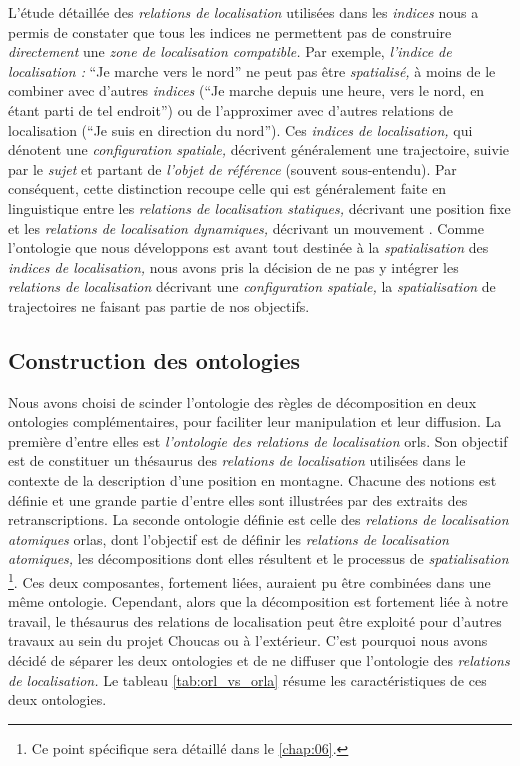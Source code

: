 L'étude détaillée des \emph{relations de localisation} utilisées dans
les \emph{indices} nous a permis de constater que tous les indices ne
permettent pas de construire \emph{directement} une \emph{zone de
  localisation compatible.} Par exemple, \emph{l'indice de
  localisation :} \enquote{Je marche vers le nord} ne peut pas être
\emph{spatialisé,} à moins de le combiner avec d'autres \emph{indices}
(\eg \enquote{Je marche depuis une heure, vers le nord, en étant parti
  de tel endroit}) ou de l'approximer avec d'autres relations de
localisation (\eg \enquote{Je suis en direction du nord}). Ces
\emph{indices de localisation,} qui dénotent une \emph{configuration
  spatiale,} décrivent généralement une trajectoire, suivie par le
\emph{sujet} et partant de \emph{l'objet de référence} (souvent
sous-entendu). Par conséquent, cette distinction recoupe celle qui est
généralement faite en linguistique entre les \emph{relations de
  localisation statiques,} décrivant une position fixe et les
\emph{relations de localisation dynamiques,} décrivant un mouvement
\autocite{Borillo1998}. Comme l'ontologie que nous développons est
avant tout destinée à la \emph{spatialisation} des \emph{indices de
  localisation,} nous avons pris la décision de ne pas y intégrer les
\emph{relations de localisation} décrivant une \emph{configuration
  spatiale,} la \emph{spatialisation} de trajectoires ne faisant pas
partie de nos objectifs.

\subsection{Construction des ontologies}


Nous avons choisi de scinder l'ontologie des règles de décomposition
en deux ontologies complémentaires, pour faciliter leur manipulation
et leur diffusion. La première d'entre elles est \emph{l'ontologie des
  relations de localisation} \acp{orl}. Son objectif est de constituer
un thésaurus des \emph{relations de localisation} utilisées dans le
contexte de la description d'une position en montagne. Chacune des
notions est définie et une grande partie d'entre elles sont illustrées
par des extraits des retranscriptions. La seconde ontologie définie
est celle des \emph{relations de localisation atomiques} \acp{orla},
dont l'objectif est de définir les \emph{relations de localisation
  atomiques,} les décompositions dont elles résultent et le processus
de \emph{spatialisation} \footnote{Ce point spécifique sera détaillé
  dans le \autoref{chap:06}.}. Ces deux composantes, fortement liées,
auraient pu être combinées dans une même ontologie. Cependant, alors
que la décomposition est fortement liée à notre travail, le thésaurus
des relations de localisation peut être exploité pour d'autres travaux
au sein du projet Choucas ou à l'extérieur. C'est pourquoi nous avons
décidé de séparer les deux ontologies et de ne diffuser que
l'ontologie des \emph{relations de localisation.} Le tableau
\ref{tab:orl_vs_orla} résume les caractéristiques de ces deux
ontologies.

